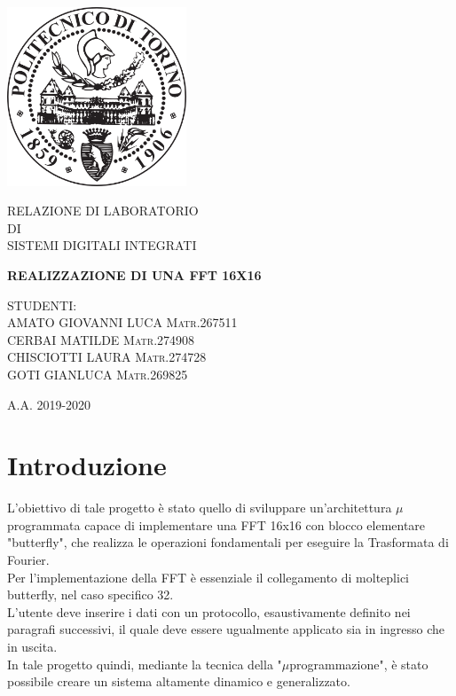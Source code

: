 \documentclass[a4paper, titlepage]{article}
\begin{document}
\begin{titlepage}
\begin {center}
\includegraphics[width=0.40\textwidth]{Politecnico_di_Torino_-_Logo.png}\par\vspace{1cm}
	\vspace{1 cm}
	{\scshape\Large RELAZIONE DI LABORATORIO \\DI\\SISTEMI DIGITALI INTEGRATI\par}
	\vspace{1.5 cm}
	{\huge\bfseries REALIZZAZIONE DI UNA FFT 16X16\par}
	\vspace{2.5 cm}
\end {center} 
	{\scshape\Large STUDENTI:\\AMATO GIOVANNI LUCA Matr.267511
	\\CERBAI MATILDE Matr.274908 \\CHISCIOTTI LAURA Matr.274728\\GOTI GIANLUCA Matr.269825\\\par}
	\vfill
	
	\vfill
\begin{center}
	{\large A.A. 2019-2020}
\end{center}
\end{titlepage}

\newpage
\tableofcontents
\newpage



\section{Introduzione} %
L'obiettivo di tale progetto è stato quello di sviluppare un'architettura $\mu$programmata capace di implementare una FFT 16x16 con blocco elementare "butterfly", che realizza le operazioni fondamentali per eseguire la Trasformata di Fourier.\\Per l'implementazione della FFT è essenziale il collegamento di molteplici butterfly, nel caso specifico 32.\\ %
L'utente deve inserire i dati con un protocollo, esaustivamente definito nei paragrafi successivi, il quale deve essere ugualmente applicato sia in ingresso che in uscita.\\In tale progetto quindi, mediante la tecnica della "$\mu$programmazione", è stato possibile creare un sistema altamente dinamico e generalizzato.
\end{document}
